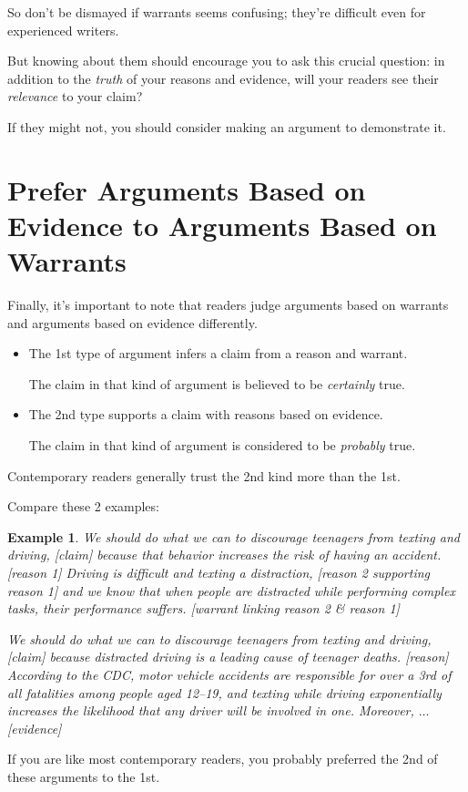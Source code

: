 \documentclass[oneside]{book}
\numberwithin{equation}{section}
\newtheorem{example}{Example}[section]
\begin{document}
%
So don't be dismayed if warrants seems confusing; they're difficult even for experienced writers.

But knowing about them should encourage you to ask this crucial question: in addition to the \textit{truth} of your reasons and evidence, will your readers see their \textit{relevance} to your claim?

If they might not, you should consider making an argument to demonstrate it.

\section{Prefer Arguments Based on Evidence to Arguments Based on Warrants}
Finally, it's important to note that readers judge arguments based on warrants and arguments based on evidence differently.
\begin{itemize}
    \item The 1st type of argument infers a claim from a reason and warrant.
    
    The claim in that kind of argument is believed to be \textit{certainly} true.
    \item The 2nd type supports a claim with reasons based on evidence.
    
    The claim in that kind of argument is considered to be \textit{probably} true.
\end{itemize}
Contemporary readers generally trust the 2nd kind more than the 1st.

Compare these 2 examples:
\begin{example}
    We should do what we can to discourage teenagers from texting and driving, \emph{[claim]} because that behavior increases the risk of having an accident. \emph{[reason 1]} Driving is difficult and texting a distraction, \emph{[reason 2 supporting reason 1]} and we know that when people are distracted while performing complex tasks, their performance suffers. \emph{[warrant linking reason 2 \& reason 1]}
    
    We should do what we can to discourage teenagers from texting and driving, \emph{[claim]} because distracted driving is a leading cause of teenager deaths. \emph{[reason]} According to the CDC, motor vehicle accidents are responsible for over a 3rd of all fatalities among people aged 12--19, and texting while driving exponentially increases the likelihood that any driver will be involved in one. Moreover, $\ldots$ \emph{[evidence]}
\end{example}
If you are like most contemporary readers, you probably preferred the 2nd of these arguments to the 1st.
\end{document}
